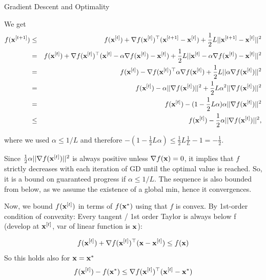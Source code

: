 \documentclass[11pt,compress,t,notes=noshow, xcolor=table]{beamer}
\begin{document}
\begin{vbframe}{Gradient Descent and Optimality}
\begin{footnotesize}
	We get
	\vspace*{-0.3cm}
	\begin{eqnarray*}
	f(\mathbf{x}^{[t+1]}) &\leq& f(\mathbf{x}^{[t]}) + \nabla f(\mathbf{x}^{[t]})^\top(\mathbf{x}^{[t+1]} - \mathbf{x}^{[t]}) + \frac{1}{2}L ||\mathbf{x}^{[t+1]} - \mathbf{x}^{[t]}||^2 \\
	&=& f(\mathbf{x}^{[t]}) + \nabla f(\mathbf{x}^{[t]})^\top(\mathbf{x}^{[t]} - \alpha \nabla f(\mathbf{x}^{[t]}) - \mathbf{x}^{[t]}) + \frac{1}{2}L ||\mathbf{x}^{[t]} - \alpha \nabla f(\mathbf{x}^{[t]}) - \mathbf{x}^{[t]}||^2 \\
	& = & f(\mathbf{x}^{[t]}) - \nabla f(\mathbf{x}^{[t]})^\top \alpha  \nabla f(\mathbf{x}^{[t]}) + \frac{1}{2}L ||\alpha \nabla f(\mathbf{x}^{[t]})||^2 \\
	&=& f(\mathbf{x}^{[t]}) - \alpha ||\nabla f(\mathbf{x}^{[t]})||^2 + \frac{1}{2}L\alpha^2 ||\nabla f(\mathbf{x}^{[t]})||^2 \\
	&=& f(\mathbf{x}^{[t]}) - (1 - \frac{1}{2} L \alpha)\alpha  ||\nabla f(\mathbf{x}^{[t]})||^2 \\
	&\le& f(\mathbf{x}^{[t]}) - \frac{1}{2}\alpha ||\nabla f(\mathbf{x}^{[t]})||^2, 
	\end{eqnarray*}

	where we used $\alpha \leq 1/L$ and therefore $- (1 - \frac{1}{2} L \alpha) \leq \frac{1}{2} L \frac{1}{L} -1 = -\frac{1}{2}$.
				
	Since $\frac{1}{2} \alpha ||\nabla f(\mathbf{x}^{[t]})||^2$ is always positive unless $\nabla f(\mathbf{x}) = 0$, it implies that $f$ strictly decreases with each iteration of GD until the optimal value is reached.  So, it is a bound on guaranteed progress if $\alpha \leq 1/L$. 
 The sequence is also bounded from below, as we assume the existence of a global min, hence it convergences.
	\end{footnotesize}
	
	\framebreak
	
			Now, we bound $f(\mathbf{x}^{[t]})$ in terms of $f(\mathbf{x}^\ast)$ using that $f$ is convex. By 1st-order condition of convexity: Every tangent / 1st order Taylor is always below f (develop at $\mathbf{x}^{[t]}$, var of linear function is $\mathbf{x}$):
    
            $$
			f(\mathbf{x}^{[t]}) + \nabla f(\mathbf{x}^{[t]})^\top (\mathbf{x} - \mathbf{x}^{[t]})
            \leq f(\mathbf{x})
    		$$ 
            So this holds also for $\mathbf{x} = \mathbf{x}^\ast$ 
			$$
			f(\mathbf{x}^{[t]}) - f(\mathbf{x}^\ast) \leq  \nabla f(\mathbf{x}^{[t]})^\top (\mathbf{x}^{[t]} - \mathbf{x}^\ast)
			$$ 	

            \framebreak
			

\end{vbframe}
\end{document}
